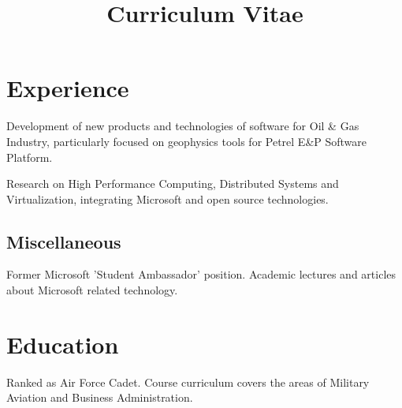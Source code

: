 \documentclass[11pt,a4paper,sans]{moderncv} %
\title{Curriculum Vitae}
\begin{document}
\makecvtitle %





\section{Experience}


{
Development of new products and technologies of software for Oil \& Gas Industry, particularly focused on geophysics tools for Petrel E\&P Software Platform. 
}



{
Research on High Performance Computing, Distributed Systems and Virtualization, integrating Microsoft and open source technologies.
}


\subsection{Miscellaneous}

{Former Microsoft 'Student Ambassador' position.\newline{}
Academic lectures and articles about Microsoft related technology.}








\section{Education}

{
Ranked as Air Force Cadet. \newline{}
Course curriculum covers the areas of Military Aviation and Business Administration. 
}
\end{document}
